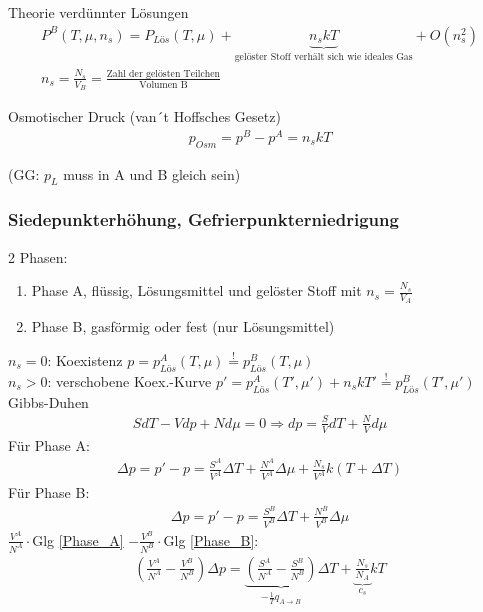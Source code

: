 Theorie verdünnter Lösungen
\begin{align}
    P^B(T,\mu , n_s)=P_{Lös}(T,\mu)+\underbrace{n_skT}_{\text{gelöster Stoff verhält sich wie ideales Gas}}+O(n^2_s)\\
    n_s=\frac{N_s}{V_B}=\frac{\text{Zahl der gelösten Teilchen}}{\text{Volumen B}}
\end{align}
\begin{definition}{Osmotischer Druck (van´t Hoffsches Gesetz)}
\begin{align}
    p_{Osm}=p^B-p^A=n_skT
\end{align}
\end{definition}
(GG: $p_L$ muss in A und B gleich sein)
\subsubsection{Siedepunkterhöhung, Gefrierpunkterniedrigung}
2 Phasen:
\begin{enumerate}
    \item Phase A, flüssig, Lösungsmittel und gelöster Stoff mit $n_s=\frac{N_s}{V_A}$
    \item Phase B, gasförmig oder fest (nur Lösungsmittel)
\end{enumerate}
$n_s=0$: Koexistenz $p=p^A_{Lös}(T,\mu)\overset{!}{=} p^B_{Lös}(T,\mu)$\\
$n_s > 0$: verschobene Koex.-Kurve $p'=p^A_{Lös}(T',\mu ')+n_skT'\overset{!}{=} p^B_{Lös}(T',\mu')$\\
Gibbs-Duhen
\begin{align}
    SdT-Vdp+Nd\mu=0 \Rightarrow dp=\frac{S}{V}dT +\frac{N}{V}d\mu 
\end{align}
Für Phase A:
\begin{align}
    \Delta p = p'-p=\frac{S^A}{V^A}\Delta T+ \frac{N^A}{V^A}\Delta\mu + \frac{N_s}{V^A}k(T+\Delta T)
    \label{Phase_A}
\end{align}
Für Phase B:
\begin{align}
     \Delta p = p'-p=\frac{S^B}{V^B}\Delta T+ \frac{N^B}{V^B}\Delta\mu
     \label{Phase_B}
\end{align}
$\frac{V^A}{N^A}\cdot$Glg \ref{Phase_A} $-\frac{V^B}{N^B}\cdot$Glg \ref{Phase_B}:
\begin{align}
    \left(\frac{V^A}{N^A}-\frac{V^B}{N^B}\right)\Delta p = \underbrace{\left(\frac{S^A}{N^A}-\frac{S^B}{N^B}\right)}_{-\frac{1}{T}q_{A\rightarrow B}}\Delta T + \underbrace{\frac{N_s}{N_A}}_{c_s}kT
\end{align}
